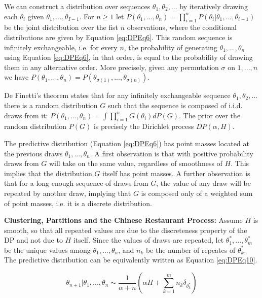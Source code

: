 We can construct a distribution over sequences $\theta_{1},\theta_{2},...$ by iteratively drawing each $\theta_{i}$ given $\theta_{1},...,\theta_{I-1}$. For $n\geq1$ let $P(\theta_{1},...,\theta_{n})=\prod_{i=1}^{n}P(\theta_{i}|\theta_{1},...,\theta_{i-1})$ be the joint distribution over the fist $n$ observations, where the conditional distributions are given by Equation \ref{eq:DPEq6}. This random sequence is infinitely exchangeable, i.e. for every $n$, the probability of generating $\theta_{1},...,\theta_{n}$ using Equation \ref{eq:DPEq6}, in that order, is equal to the probability of drawing them in any alternative order. More precisely, given any permutation $\sigma$ on $1,...,n$ we have $P(\theta_{1},...,\theta_{n})=P(\theta_{\sigma(1)},...,\theta_{\sigma(n)})$.

De Finetti's theorem states that for any infinitely exchangeable sequence $\theta_{1},\theta_{2},...$ there is a random distribution $G$ such that the sequence is composed of i.i.d. draws from it: $P(\theta_{1},...,\theta_{n})=\int\prod_{i=1}^{n}G(\theta_{i})dP(G)$. The prior over the random distribution $P(G)$ is precisely the Dirichlet process $DP(\alpha,H)$.

The predictive distribution (Equation \ref{eq:DPEq6}) has point masses located at the previous draws $\theta_{1},...,\theta_{n}$. A first observation is that with positive probability draws from $G$ will take on the same value, regardless of smoothness of $H$. This implies that the distribution $G$ itself has point masses. A further observation is that for a long enough sequence of draws from $G$, the value of any draw will be repeated by another draw, implying that $G$ is composed only of a weighted sum of point masses, i.e. it is a discrete distribution.

\textbf{Clustering, Partitions and the Chinese Restaurant Process:} Assume $H$ is smooth, so that all repeated values are due to the discreteness property of the DP and not due to $H$ itself. Since the values of draws are repeated, let $\theta_{1}^{*},...,\theta_{m}^{*}$ be the unique values among $\theta_{1},...,\theta_{n}$, and $n_{k}$ be the number of repeates of $\theta_{k}^{*}$. The predictive distribution can be equivalently written as Equation \ref{eq:DPEq10}.

\begin{equation}
\label{eq:DPEq10}
\theta_{n+1}|\theta_{1},...,\theta_{n}\sim\frac{1}{\alpha+n}\left(\alpha H+\sum_{k=1}^{m}n_{k}\delta_{\theta_{k}^{*}}\right)
\end{equation}


